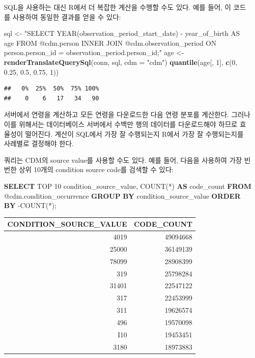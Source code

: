 \documentclass[10.5pt]{book}
\newenvironment{Shaded}{\begin{snugshade}}{\end{snugshade}}
\newcommand{\KeywordTok}[1]{\textcolor[rgb]{0.13,0.29,0.53}{\textbf{#1}}}
\newcommand{\DataTypeTok}[1]{\textcolor[rgb]{0.13,0.29,0.53}{#1}}
\newcommand{\DecValTok}[1]{\textcolor[rgb]{0.00,0.00,0.81}{#1}}
\newcommand{\FloatTok}[1]{\textcolor[rgb]{0.00,0.00,0.81}{#1}}
\newcommand{\StringTok}[1]{\textcolor[rgb]{0.31,0.60,0.02}{#1}}
\newcommand{\FunctionTok}[1]{\textcolor[rgb]{0.00,0.00,0.00}{#1}}
\newcommand{\NormalTok}[1]{#1}
\theoremstyle{definition}
\theoremstyle{definition}
\theoremstyle{definition}
\theoremstyle{remark}
\begin{document}
SQL을 사용하는 대신 R에서 더 복잡한 계산을 수행할 수도 있다. 예를 들어,
이 코드를 사용하여 동일한 결과를 얻을 수 있다:

\begin{Shaded}
\begin{Highlighting}[]
\NormalTok{sql <-}\StringTok{ "SELECT YEAR(observation_period_start_date) -}
\StringTok{               year_of_birth AS age}
\StringTok{FROM @cdm.person}
\StringTok{INNER JOIN @cdm.observation_period}
\StringTok{  ON person.person_id = observation_period.person_id;"}
\NormalTok{age <-}\StringTok{ }\KeywordTok{renderTranslateQuerySql}\NormalTok{(conn, sql, }\DataTypeTok{cdm =} \StringTok{"cdm"}\NormalTok{)}
\KeywordTok{quantile}\NormalTok{(age[, }\DecValTok{1}\NormalTok{], }\KeywordTok{c}\NormalTok{(}\DecValTok{0}\NormalTok{, }\FloatTok{0.25}\NormalTok{, }\FloatTok{0.5}\NormalTok{, }\FloatTok{0.75}\NormalTok{, }\DecValTok{1}\NormalTok{))}
\end{Highlighting}
\end{Shaded}

\begin{verbatim}
##   0%  25%  50%  75% 100%
##    0    6   17   34   90
\end{verbatim}

서버에서 연령을 계산하고 모든 연령을 다운로드한 다음 연령 분포를
계산한다. 그러나 이를 위해서는 데이터베이스 서버에서 수백만 행의
데이터를 다운로드해야 하므로 효율성이 떨어진다. 계산이 SQL에서 가장 잘
수행되는지 R에서 가장 잘 수행되는지를 사례별로 결정해야 한다.

쿼리는 CDM의 source value를 사용할 수도 있다. 예를 들어, 다음을 사용하여
가장 빈번한 상위 10개의 condition source code를 검색할 수 있다:

\begin{Shaded}
\begin{Highlighting}[]
\KeywordTok{SELECT}\NormalTok{ TOP }\DecValTok{10}\NormalTok{ condition_source_value,}
  \FunctionTok{COUNT}\NormalTok{(*) }\KeywordTok{AS}\NormalTok{ code_count}
\KeywordTok{FROM}\NormalTok{ @cdm.condition_occurrence}
\KeywordTok{GROUP} \KeywordTok{BY}\NormalTok{ condition_source_value}
\KeywordTok{ORDER} \KeywordTok{BY}\NormalTok{ -COUNT(*);}
\end{Highlighting}
\end{Shaded}

\begin{longtable}[]{@{}rr@{}}
\toprule
CONDITION\_SOURCE\_VALUE & CODE\_COUNT\tabularnewline
\midrule
\endhead
4019 & 49094668\tabularnewline
25000 & 36149139\tabularnewline
78099 & 28908399\tabularnewline
319 & 25798284\tabularnewline
31401 & 22547122\tabularnewline
317 & 22453999\tabularnewline
311 & 19626574\tabularnewline
496 & 19570098\tabularnewline
I10 & 19453451\tabularnewline
3180 & 18973883\tabularnewline
\bottomrule
\end{longtable}
\end{document}
